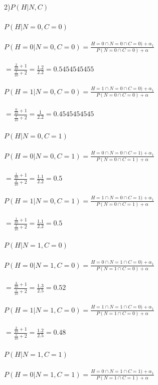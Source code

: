 \documentclass[a4paper]{article}
\begin{document}
2)$P(H|N,C)$
\\
\\
$P(H | N=0,C=0)$
\\
\\
$P(H=0 | N=0,C=0) = \frac{H=0 \cap  N=0 \cap  C=0) +\alpha_1}{P(N=0 \cap C=0) +\alpha}$
\\
\\
$=\frac{\frac{2}{10}+1}{\frac{2}{10}+2}=\frac{1.2}{2.2}=0.5454545455$
\\
\\
$P(H=1 | N=0,C=0) = \frac{H=1 \cap  N=0 \cap  C=0) +\alpha_1}{P(N=0 \cap C=0) +\alpha}$
\\
\\
$=\frac{\frac{0}{10}+1}{\frac{2}{10}+2}=\frac{1}{2.2}= 0.4545454545$
\\
\\
$P(H | N=0,C=1)$
\\
\\
$P(H=0 | N=0,C=1) = \frac{H=0 \cap  N=0 \cap  C=1) +\alpha_1}{P(N=0 \cap C=1) +\alpha}$
\\
\\
$=\frac{\frac{1}{10}+1}{\frac{2}{10}+2}=\frac{1.1}{2.2}=0.5$
\\
\\
$P(H=1 | N=0,C=1) = \frac{H=1 \cap  N=0 \cap  C=1) +\alpha_1}{P(N=0 \cap C=1) +\alpha}$
\\
\\
$=\frac{\frac{1}{10}+1}{\frac{2}{10}+2}=\frac{1.1}{2.2}=0.5$
\\
\\
$P(H | N=1,C=0)$
\\
\\
$P(H=0 | N=1,C=0) = \frac{H=0 \cap  N=1 \cap  C=0) +\alpha_1}{P(N=1 \cap C=0) +\alpha}$
\\
\\
$=\frac{\frac{3}{10}+1}{\frac{5}{10}+2}=\frac{1.3}{2.5}=0.52$
\\
\\
$P(H=1 | N=1,C=0) = \frac{H=1 \cap  N=1 \cap  C=0) +\alpha_1}{P(N=1 \cap C=0) +\alpha}$
\\
\\
$=\frac{\frac{2}{10}+1}{\frac{5}{10}+2}=\frac{1.2}{2.5}=0.48$
\\
\\
$P(H | N=1,C=1)$
\\
\\
$P(H=0 | N=1,C=1) = \frac{H=0 \cap  N=1 \cap  C=1) +\alpha_1}{P(N=1 \cap C=1) +\alpha}$
\\
\\
\end{document}
